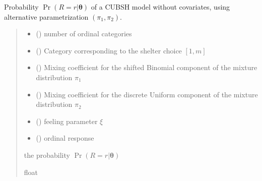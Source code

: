\documentclass[letterpaper,10pt,english]{sphinxmanual}
\begin{document}

\begin{fulllineitems}
\label{\detokenize{cubmods:cubmods.cubsh.prob}}
\pysigstartsignatures
{}
\pysigstopsignatures
\sphinxAtStartPar
Probability \(\Pr(R = r | \pmb\theta)\) of a CUBSH model without covariates,
using alternative parametrization \((\pi_1, \pi_2)\).
\begin{quote}\begin{description}
\begin{itemize}
\item {} 
\sphinxAtStartPar
{} () \textendash{} number of ordinal categories

\item {} 
\sphinxAtStartPar
{} () \textendash{} Category corresponding to the shelter choice \([1,m]\)

\item {} 
\sphinxAtStartPar
{} () \textendash{} Mixing coefficient for the shifted Binomial component of the mixture distribution \(\pi_1\)

\item {} 
\sphinxAtStartPar
{} () \textendash{} Mixing coefficient for the discrete Uniform component of the mixture distribution \(\pi_2\)

\item {} 
\sphinxAtStartPar
{} () \textendash{} feeling parameter \(\xi\)

\item {} 
\sphinxAtStartPar
{} () \textendash{} ordinal response

\end{itemize}

\sphinxAtStartPar
the probability \(\Pr(R = r | \pmb\theta)\)

\sphinxAtStartPar
float

\end{description}\end{quote}

\end{fulllineitems}
\end{document}
